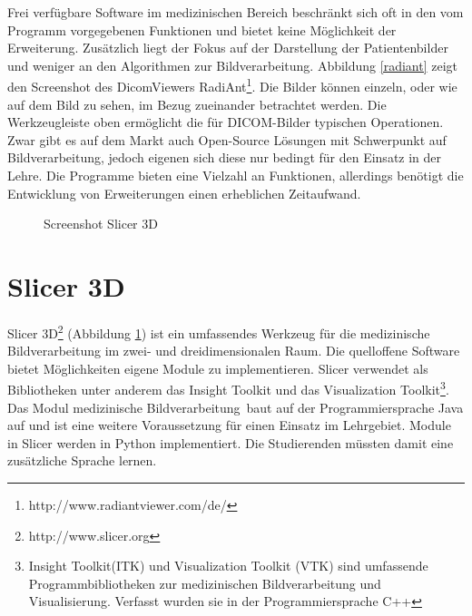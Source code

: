 Frei verfügbare Software im medizinischen Bereich beschränkt sich oft in den vom Programm vorgegebenen Funktionen und bietet keine Möglichkeit der Erweiterung. Zusätzlich liegt der Fokus auf der Darstellung der Patientenbilder und weniger an den Algorithmen zur Bildverarbeitung. Abbildung \ref{radiant} zeigt den Screenshot des DicomViewers RadiAnt\footnote{http://www.radiantviewer.com/de/}. Die Bilder können einzeln, oder wie auf dem Bild zu sehen, im Bezug zueinander betrachtet werden. Die Werkzeugleiste oben ermöglicht die für DICOM-Bilder typischen Operationen.
Zwar gibt es auf dem Markt auch Open-Source Lösungen mit Schwerpunkt auf Bildverarbeitung, jedoch eigenen sich diese nur bedingt für den Einsatz in der Lehre. Die Programme bieten eine Vielzahl an Funktionen, allerdings benötigt die Entwicklung von Erweiterungen einen erheblichen Zeitaufwand.
 
\begin{figure}[htbp]
  \vspace{0.5cm}
  \centering
  \caption{Screenshot Slicer 3D}
  \label{slicer3d}
  \vspace{0.5cm}
\end{figure}

\section{Slicer 3D}

Slicer 3D\footnote{http://www.slicer.org} (Abbildung \ref{slicer3d}) ist ein umfassendes Werkzeug für die medizinische Bildverarbeitung im zwei- und dreidimensionalen Raum. Die quelloffene Software bietet Möglichkeiten eigene Module zu implementieren. Slicer verwendet als Bibliotheken unter anderem das Insight Toolkit und das Visualization Toolkit\footnote{Insight Toolkit(ITK) und Visualization Toolkit (VTK) sind umfassende Programmbibliotheken zur medizinischen Bildverarbeitung und Visualisierung. Verfasst wurden sie in der Programmiersprache C++}. Das Modul \glqq medizinische Bildverarbeitung\grqq\ baut auf der Programmiersprache Java auf und ist eine weitere Voraussetzung für einen Einsatz im Lehrgebiet. Module in Slicer werden in Python implementiert. Die Studierenden müssten damit eine zusätzliche Sprache lernen.\\

